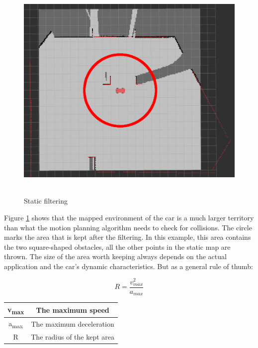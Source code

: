\begin{figure}[!ht]
    \centering
    \includegraphics[height=110mm]{figures/raw/rviz_2_near_static_objects_filter.png}
    \caption{Static filtering}
    \label{rviz_2_near_static_objects_filter}
\end{figure}

Figure \ref{rviz_2_near_static_objects_filter} shows that the mapped environment of the car is a much larger territory than what the motion planning algorithm needs to check for collisions. The circle marks the area that is kept after the filtering. In this example, this area contains the two square-shaped obstacles, all the other points in the static map are thrown. The size of the area worth keeping always depends on the actual application and the car's dynamic characteristics. But as a general rule of thumb:

\[ R = \frac{v_{max}^2}{a_{max}} \]

\begin{center}
    \begin{tabular}{ | c | c | }
        \hline
        v\textsubscript{max}	& The maximum speed   			\\
        \hline
        a\textsubscript{max}  	& The maximum deceleration      \\
        \hline
        R  						& The radius of the kept area	\\
        \hline
    \end{tabular}
\end{center}


